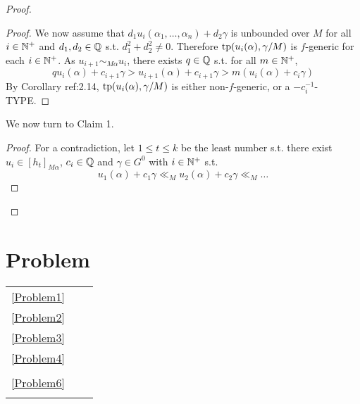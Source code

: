 \documentclass[11pt]{article}
\begin{document}
\begin{proof}
\begin{proof}
We now assume that \(d_1u_i(\alpha_1,\dots,\alpha_n)+d_2\gamma\) is unbounded over \(M\) for all
\(i\in\mathbb{N}^+\) and \(d_1,d_2\in\mathbb{Q}\) s.t. \(d_1^2+d_2^2\neq 0\). Therefore \(\operatorname{tp}(u_i(\alpha),\gamma/M)\) is \(f\)-generic
for each \(i\in\mathbb{N}^+\). As \(u_{i+1}\sim_{M\alpha}u_i\), there exists \(q\in\mathbb{Q}\) s.t.
for all \(m\in\mathbb{N}^+\),
\begin{equation*}
qu_i(\alpha)+c_{i+1}\gamma>u_{i+1}(\alpha)+c_{i+1}\gamma>m(u_i(\alpha)+c_i\gamma)
\end{equation*}
By Corollary ref:2.14, \(\operatorname{tp}(u_i(\alpha),\gamma/M)\) is either non-\(f\)-generic, or a \(-c_i^{-1}\)-TYPE.
\end{proof}


We now turn to Claim 1.
\begin{proof}
For a contradiction, let \(1\le t\le k\) be the least number s.t. there exist \(u_i\in[h_t]_{M\alpha}\), \(c_i\in\mathbb{Q}\)
and \(\gamma\in G^0\) with \(i\in\mathbb{N}^+\) s.t.
\begin{equation*}
u_1(\alpha)+c_1\gamma\ll_Mu_2(\alpha)+c_2\gamma\ll_M\dots
\end{equation*}
\end{proof}
\end{proof}

\section{Problem}
\label{sec:org99d7733}
\begin{center}
\begin{tabular}{lll}
\ref{Problem1} &  & \\[0pt]
\ref{Problem2} &  & \\[0pt]
\ref{Problem3} &  & \\[0pt]
\ref{Problem4} &  & \\[0pt]
 &  & \\[0pt]
\ref{Problem6} &  & \\[0pt]
 &  & \\[0pt]
\end{tabular}
\end{center}
\end{document}

